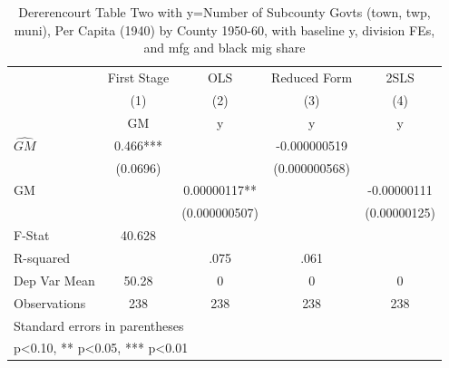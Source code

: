 \begin{table}[htbp]\centering
\def\sym#1{\ifmmode^{#1}\else\(^{#1}\)\fi}
\caption{Dererencourt Table Two with y=Number of Subcounty Govts (town, twp, muni), Per Capita (1940) by County 1950-60, with baseline y, division FEs, and mfg and black mig share}
\begin{tabular}{l*{4}{c}}
\toprule
                    & First Stage   &         OLS   &Reduced Form   &        2SLS   \\
                    &\multicolumn{1}{c}{(1)}&\multicolumn{1}{c}{(2)}&\multicolumn{1}{c}{(3)}&\multicolumn{1}{c}{(4)}\\
                    &\multicolumn{1}{c}{GM}&\multicolumn{1}{c}{y}&\multicolumn{1}{c}{y}&\multicolumn{1}{c}{y}\\
\midrule
$\hat{GM}$          &       0.466***&               &-0.000000519   &               \\
                    &    (0.0696)   &               &(0.000000568)   &               \\
\addlinespace
GM                  &               &  0.00000117** &               & -0.00000111   \\
                    &               &(0.000000507)   &               &(0.00000125)   \\
\midrule
F-Stat              &      40.628   &               &               &               \\
R-squared           &               &        .075   &        .061   &               \\
Dep Var Mean        &       50.28   &           0   &           0   &           0   \\
Observations        &         238   &         238   &         238   &         238   \\
\bottomrule
\multicolumn{5}{l}{\footnotesize Standard errors in parentheses}\\
\multicolumn{5}{l}{\footnotesize * p<0.10, ** p<0.05, *** p<0.01}\\
\end{tabular}
\end{table}
